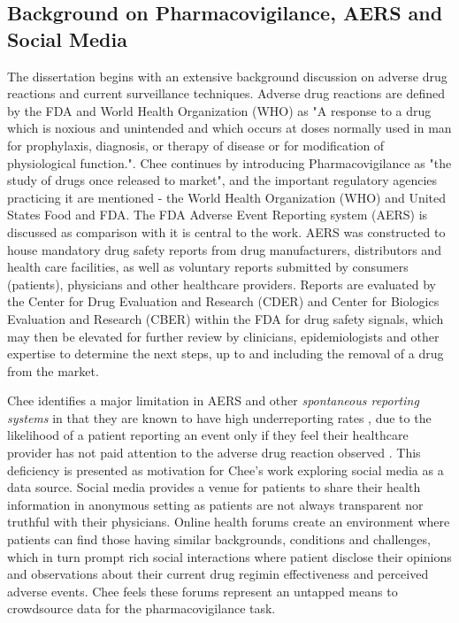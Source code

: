 \documentclass[twoside,11pt]{article}
\begin{document}
\subsection{Background on Pharmacovigilance, AERS and Social Media}
The dissertation begins with an extensive background discussion on adverse drug reactions and current surveillance techniques. Adverse drug reactions are defined by the FDA and World Health Organization (WHO) as "A response to a drug which is noxious and unintended and which occurs at doses normally used in man for prophylaxis, diagnosis, or therapy of disease or for modification of physiological function."\cite{FDA}. Chee continues by introducing Pharmacovigilance as "the study of drugs once released to market", and the important regulatory agencies practicing it are mentioned - the World Health Organization (WHO) and United States Food and FDA. The FDA Adverse Event Reporting system (AERS) is discussed as comparison with it is central to the work. AERS was constructed to house mandatory drug safety reports from drug manufacturers, distributors and health care facilities, as well as voluntary reports submitted by consumers (patients), physicians and other healthcare providers. Reports are evaluated by the Center for Drug Evaluation and Research (CDER) and Center for Biologics Evaluation and Research (CBER) within the FDA for drug safety signals, which may then be elevated for further review by clinicians, epidemiologists and other expertise to determine the next steps, up to and including the removal of a drug from the market.

Chee identifies a major limitation in AERS and other \textit{spontaneous reporting systems} in that they are known to have high underreporting rates \citep{Fletcher}, due to the likelihood of a patient reporting an event only if they feel their healthcare provider has not paid attention to the adverse drug reaction observed \citep{Leamon}. This deficiency is presented as motivation for Chee's work exploring social media as a data source. Social media provides a venue for patients to share their health information in anonymous setting as patients are not always transparent nor truthful with their physicians. Online health forums create an environment where patients can find those having similar backgrounds, conditions and challenges, which in turn prompt rich social interactions where patient disclose their opinions and observations about their current drug regimin effectiveness and perceived adverse events. Chee feels these forums represent an untapped means to crowdsource data for the pharmacovigilance task.
\end{document}
